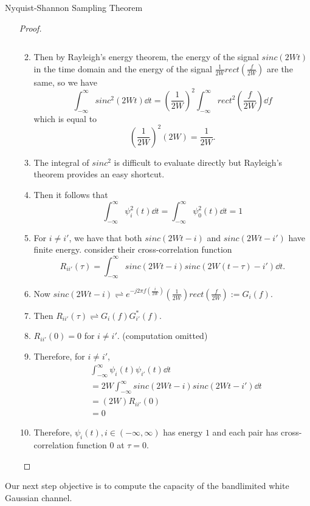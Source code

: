 \documentclass[../main.tex]{subfiles}
\begin{document}
\begin{bbox}{Nyquist-Shannon Sampling Theorem}
\begin{itemize}
\begin{remark}
\begin{proof}
\begin{enumerate}
\[            \]
            \item Then by Rayleigh's energy theorem, the energy of the signal $sinc(2Wt)$ in the time domain and the energy of the signal $\frac{1}{2W}rect(\frac{f}{2W})$ are the same, so we have \[
            \int_{-\infty}^\infty sinc^2(2Wt)\dd t = (\frac{1}{2W})^2\int_{-\infty}^\infty rect^2(\frac{f}{2W})\dd f
            \] which is equal to \[
            (\frac{1}{2W})^2(2W) =\frac{1}{2W}.
            \]
            \item The integral of $sinc^2$ is difficult to evaluate directly but Rayleigh's theorem provides an easy shortcut.
            \item Then it follows that \[
            \int_{-\infty}^\infty \psi_i^2(t)\dd t=\int_{-\infty}^\infty \psi_0^2(t)\dd t=1
            \]
            \item For $i\neq i'$, we have that both $sinc(2Wt-i)$ and $sinc(2Wt-i')$ have finite energy. consider their cross-correlation function \[
            R_{ii'}(\tau) = \int_{-\infty}^\infty sinc(2Wt-i)sinc(2W(t-\tau)-i')\dd t.
            \]
            \item Now $sinc(2Wt-i) \rightleftharpoons e^{-j2\pi f(\frac{i}{2W})}(\frac{1}{2W})rect(\frac{f}{2W}):=G_i(f)$.
            \item Then $R_{ii'}(\tau)\rightleftharpoons G_i(f)G_{i'}^*(f)$.
            \item $R_{ii'}(0)=0$ for $i\neq i'$. (computation omitted)
            \item Therefore, for $i\neq i'$, \begin{align*}
                &\int_{-\infty}^\infty \psi_i(t)\psi_{i'}(t)\dd t \\
                &=2W\int_{-\infty}^\infty sinc(2Wt-i)sinc(2Wt-i')\dd t\\
                &=(2W)R_{ii'}(0)\\
                &=0
            \end{align*}
            \item Therefore, $\psi_i(t),i\in(-\infty,\infty)$ has energy $1$ and each pair has cross-correlation function $0$ at $\tau=0$.
        \end{enumerate}
            
        \end{proof}
        \end{remark}
    \end{itemize}
\end{bbox}
Our next step objective is to compute the capacity of the bandlimited white Gaussian channel.
\end{document}
